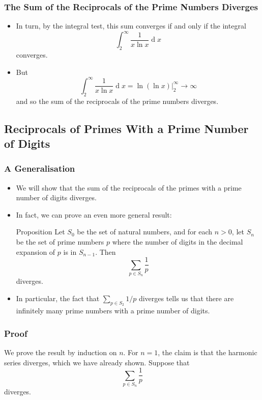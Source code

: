 \documentclass{beamer}
\newcommand{\dif}{\ensuremath{\operatorname{d}\!}}
\begin{document}
\begin{frame}
    \frametitle{The Sum of the Reciprocals of the Prime Numbers Diverges}

    \begin{itemize}
        \item In turn, by the integral test, this sum converges if and only if the integral
        \[
            \int_2^\infty \frac{1}{x \ln x} \dif x    
        \]
        converges. \pause
        \item But
        \[
            \int_2^\infty \frac{1}{x \ln x} \dif x = \ln(\ln x) \Big|_{2}^{\infty} \to \infty
        \]
        and so the sum of the reciprocals of the prime numbers diverges.
    
    \end{itemize}    

\end{frame}

\subsection{Reciprocals of Primes With a Prime Number of Digits}

\begin{frame}
    \frametitle{A Generalisation}

    \begin{itemize}
        \item We will show that the sum of the reciprocals of the primes with a prime number of digits diverges. \pause
        \item In fact, we can prove an even more general result:
        \begin{block}{Proposition}
            Let $S_0$ be the set of natural numbers, and for each $n > 0$, let $S_n$ be the set of prime numbers $p$ where the number of digits in the decimal expansion of $p$ is in $S_{n - 1}$. Then
            \[
                \sum_{p \in S_n} \frac{1}{p}    
            \]
            diverges.
        \end{block}
        \pause
        \item In particular, the fact that $\sum_{p \in S_2} 1\slash p$ diverges tells us that there are infinitely many prime numbers with a prime number of digits.
    \end{itemize} 

\end{frame}

\begin{frame}
    \frametitle{Proof}

    We prove the result by induction on $n$. \pause
    For $n = 1$, the claim is that the harmonic series diverges, which we have already shown. \pause
    Suppose that
    \[
       \sum_{p \in S_n} \frac{1}{p}
    \]
    diverges.

\end{frame}
\end{document}
